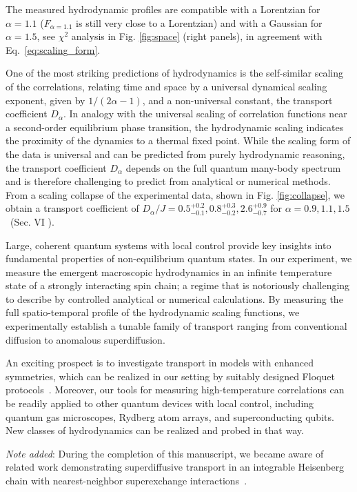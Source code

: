 \documentclass[aps,10pt,reprint,groupedaddress,superscriptaddress]{revtex4-2}
\begin{document}
The measured hydrodynamic profiles are compatible with a Lorentzian for $\alpha=1.1$  ($F_{\alpha=1.1}$ is still very close to a Lorentzian) and with a Gaussian for $\alpha=1.5$, see $\chi^2$ analysis in Fig. \ref{fig:space} (right panels), in agreement with Eq.~\ref{eq:scaling_form}. 

One of the most striking predictions of hydrodynamics is the self-similar scaling of the correlations, relating time and space by a universal dynamical scaling exponent, given by $1/(2\alpha-1)$, and a non-universal constant, the transport coefficient $D_\alpha$. In analogy with the universal scaling of correlation functions near a second-order equilibrium phase transition, the hydrodynamic scaling indicates the proximity of the dynamics to a thermal fixed point. While the scaling form of the data is universal and can be predicted from purely hydrodynamic reasoning, the transport coefficient $D_\alpha$ depends on the full quantum many-body spectrum and is therefore challenging to predict from analytical or numerical methods. From a scaling collapse of the experimental data, shown in Fig. \ref{fig:collapse}, we obtain a transport coefficient of  $D_\alpha/J=0.5_{-0.1}^{+0.2}, 0.8_{-0.2}^{+0.3}, 2.6_{-0.7}^{+0.9}$ for $\alpha=0.9, 1.1, 1.5$~(Sec. VI \cite{SI}). 


Large, coherent quantum systems with local control provide key insights into fundamental properties of non-equilibrium quantum states. In our experiment, we measure the emergent macroscopic hydrodynamics in an infinite temperature state of a strongly interacting spin chain; a regime that is notoriously challenging to describe by controlled analytical or numerical calculations.
By measuring the full spatio-temporal profile of the hydrodynamic scaling functions, we experimentally establish a tunable family of transport ranging from conventional diffusion to anomalous superdiffusion. 

An exciting prospect is to investigate transport in models with enhanced symmetries, which can be realized in our setting by suitably designed Floquet protocols~\cite{birnkammer_2020}. Moreover, our tools for measuring high-temperature correlations can be readily applied to other quantum devices with local control, including quantum gas microscopes, Rydberg atom arrays, and superconducting qubits. New classes of hydrodynamics can be realized and probed in that way. 


\textit{Note added}: During the completion of this manuscript, we became aware of related work demonstrating superdiffusive transport in an integrable Heisenberg chain with nearest-neighbor superexchange interactions~\cite{Bloch}. 
\end{document}
